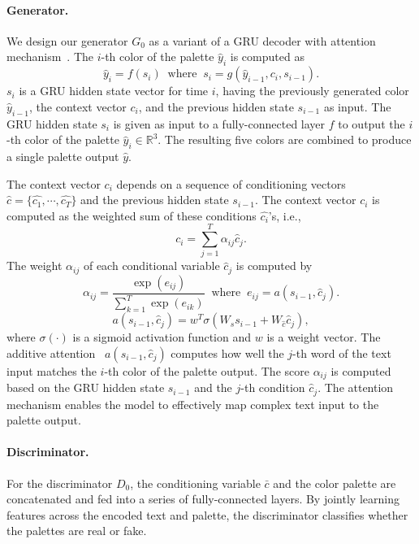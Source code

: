 \documentclass[runningheads]{llncs}
\begin{document}
\paragraph{Generator.}
\label{sec:TPN Generator}
We design our generator $G_{0}$ as a variant of a GRU decoder with attention mechanism~\cite{luong2015effective,bahdanau2014neural,cho2014learning}. The $i$-th color of the palette $\hat{y}_{i}$ is computed as
\begin{equation}
\hat{y}_{i}=f(s_{i})\;\;\mathrm{where}\;\;s_{i}=g(\hat{y}_{i-1},c_{i}, s_{i-1}).
\end{equation}
$s_{i}$ is a GRU hidden state vector for time $i$, having the previously generated color $\hat{y}_{i-1}$, the context vector $c_{i}$, and the previous hidden state $s_{i-1}$ as input. The GRU hidden state $s_{i}$ is given as input to a fully-connected layer $f$ to output the $i$-th color of the palette $\hat{y}_{i}\in\mathbb{R}^{3}$. The resulting five colors are combined to produce a single palette output $\hat{y}$. 

The context vector $c_{i}$ depends on a sequence of conditioning
vectors $\hat{c}=\{\hat{c_{1}},\cdots,\hat{c_{T}}\}$ and the previous hidden state $s_{i-1}$. The context vector $c_{i}$ is computed as the weighted sum of these conditions $\hat{c_{i}}$'s, i.e., 
\begin{equation}
c_{i}=\sum_{j=1}^{T}\alpha_{ij}\hat{c}_{j}.
\end{equation}
The weight $\alpha_{ij}$ of each conditional variable $\hat{c}_{j}$ is computed by
\begin{equation}
\alpha_{ij}=\frac{\exp(e_{ij})}{\sum_{k=1}^{T}\exp(e_{ik})}
\;\;\mathrm{where}\;\;
e_{ij}=a\left(s_{i-1},\hat{c}_{j}\right).
\end{equation}
\begin{equation}
a\left(s_{i-1},\hat{c}_{j}\right)=w^T\sigma(W_{s}s_{i-1}+W_{\hat{c}}\hat{c}_{j}),
\end{equation}
where $\sigma(\cdot)$ is a sigmoid activation function and $w$ is a weight vector. The additive attention~\cite{bahdanau2014neural} $a\left(s_{i-1},\hat{c}_{j}\right)$ computes how well the $j$-th word of the text input matches the $i$-th color of the palette output. The score $\alpha_{ij}$ is computed based on the GRU hidden state $s_{i-1}$ and the $j$-th condition $\hat{c}_{j}$. The attention mechanism enables the model to effectively map complex text input to the palette output.

\paragraph{Discriminator.}
For the discriminator $D_{0}$, the conditioning variable $\bar{c}$ and the color palette are concatenated and fed into a series of fully-connected layers. By jointly learning features across the encoded text and palette, the discriminator classifies whether the palettes are real or fake.  
\end{document}
